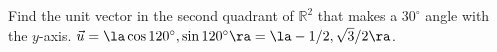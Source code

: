 {Find the unit vector in the second quadrant of $\mathbb{R}^2$ that makes a $30^\circ$ angle with the $y$-axis.
}
{$\vec u = \la \cos 120^\circ,\sin 120^\circ\ra = \la -1/2,\sqrt{3}/2\ra$.
}
